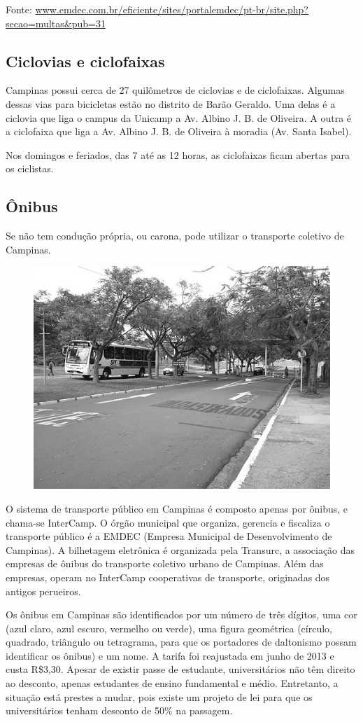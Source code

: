 Fonte: \url{www.emdec.com.br/eficiente/sites/portalemdec/pt-br/site.php?secao=multas&pub=31}

\subsection{Ciclovias e ciclofaixas}

Campinas possui cerca de 27 quilômetros de ciclovias e de ciclofaixas. Algumas dessas vias para 
bicicletas estão no distrito de Barão Geraldo. Uma delas é a ciclovia que liga o campus da Unicamp 
a Av. Albino J. B. de Oliveira. A outra é a ciclofaixa que liga a Av. Albino J. B. de Oliveira 
à moradia (Av. Santa Isabel).

Nos domingos e feriados, das 7 até as 12 horas, as ciclofaixas ficam abertas para os ciclistas.

\subsection{Ônibus}

Se não tem condução própria, ou carona, pode utilizar o transporte coletivo de
Campinas.

\begin{figure}[h!]
    \centering
    \includegraphics[width=.45\textwidth]{img/barao/onibus.jpg}
\end{figure}

O sistema de transporte público em Campinas é composto apenas por ônibus, e
chama-se InterCamp. O órgão municipal que organiza, gerencia e fiscaliza o
transporte público é a EMDEC (Empresa Municipal de Desenvolvimento de Campinas).
A bilhetagem eletrônica é organizada pela Transurc, a associação das empresas
de ônibus do transporte coletivo urbano de Campinas. Além das empresas, operam
no InterCamp cooperativas de transporte, originadas dos antigos perueiros.

Os ônibus em Campinas são identificados por um número de três dígitos, uma cor
(azul claro, azul escuro, vermelho ou verde), uma figura geométrica (círculo,
quadrado, triângulo ou tetragrama, para que os portadores de daltonismo possam
identificar os ônibus) e um nome. A tarifa foi reajustada em junho de 2013 e
custa R\$3,30. Apesar de existir passe de estudante, universitários não têm
direito ao desconto, apenas estudantes de ensino fundamental e médio. 
Entretanto, a situação está prestes a mudar, pois existe um projeto de lei
para que os universitários tenham desconto de 50\% na passagem.

